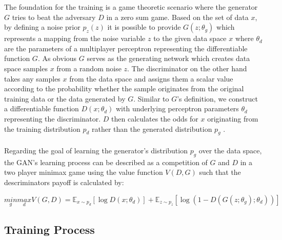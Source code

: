   The foundation for the training is a game theoretic scenario where the generator \(  G  \) tries to beat the adversary \(  D  \) in a zero sum game.
  Based on the set of data \(  x  \), by defining a noise prior \(  p_z(z)  \) it is possible to provide \(  G(z; \theta_g)  \) which represents a mapping from the noise variable \(  z  \) to the given data space \( x \) where \( \theta_d \) are the parameters of a multiplayer perceptron representing the differentiable function \( G \).
  As obvious \( G \) serves as the generating network which creates data space samples \( x \) from a random noise \( z \).
  The discriminator on the other hand takes any samples \( x \) from the data space and assigns them a scalar value according to the probability whether the sample originates from the original training data or the data generated by \( G \).
  Similar to \( G \)'s definition, we construct a differentiable function \( D(x; \theta_d) \) with underlying perceptron parameters \( \theta_d \) representing the discriminator.
  \( D \) then calculates the odds for \( x \) originating from the training distribution \( p_d \) rather than the generated distribution \( p_g \) \cite{1,2}.
  \\
  \\
  Regarding the goal of learning the generator's distribution \( p_g \) over the data space, the GAN's learning process can be described as a competition of \( G \) and \( D \) in a two player minimax game using the value function \( V(D,G) \) such that the descriminators payoff is calculated by:

  \begin{equation}
  \label{gan_equation_1}
  \underset{g}{min} \underset{d}{max} V(G,D) =  \mathbb{E}_{x \sim p_d}[\log D(x; \theta_d)] + \mathbb{E}_{z \sim p_z}[\log(1 - D(G(z; \theta_g); \theta_d))]
  \end{equation}

  \cite[Equation (1)]{1}

  \subsection{Training Process}

